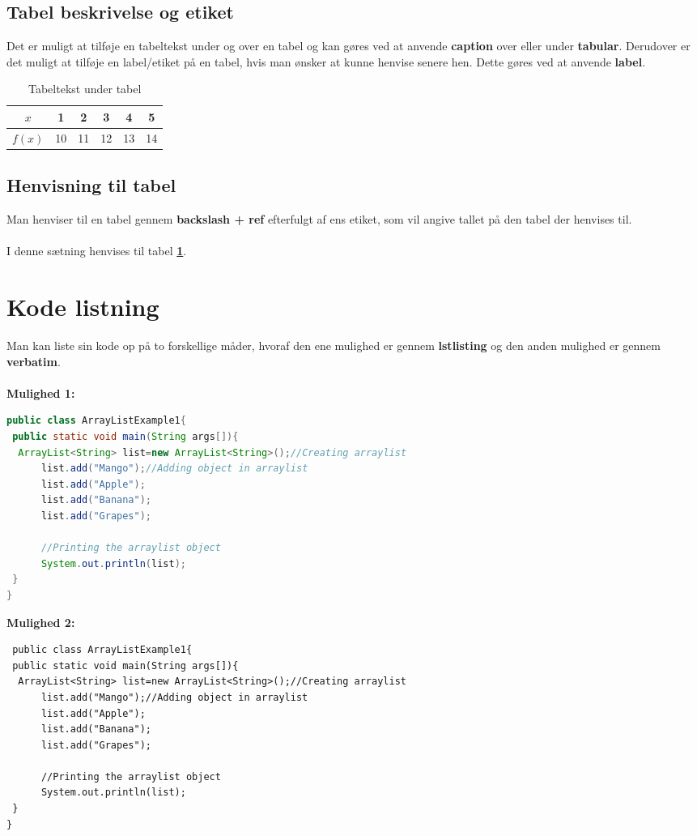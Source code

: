 \documentclass[11pt]{article}
\begin{document}
\subsection{Tabel beskrivelse og etiket}
Det er muligt at tilføje en tabeltekst under og over en tabel og kan gøres ved at anvende \textbf{caption} over eller under \textbf{tabular}. Derudover er det muligt at tilføje en label/etiket på en tabel, hvis man ønsker at kunne henvise senere hen. Dette gøres ved at anvende \textbf{label}.
\begin{table}[H]
\centering
\def\arraystretch{1.5} 
\begin{tabular}{|c||c|c|c|c|c|} %
\hline
$x$&1&2&3&4&5\\ \hline %
$f(x)$&10&11&12&13&14\\ \hline
\end{tabular}
\caption{Tabeltekst under tabel}
\label{tab:tal}
\end{table}


\subsection{Henvisning til tabel}
Man henviser til en tabel gennem \textbf{backslash + ref} efterfulgt af ens etiket, som vil angive tallet på den tabel der henvises til. \\\\
I denne sætning henvises til tabel \textbf{\ref{tab:tal}}.
\clearpage

\section{Kode listning}
Man kan liste sin kode op på to forskellige måder, hvoraf den ene mulighed er gennem \textbf{lstlisting} og den anden mulighed er gennem \textbf{verbatim}.\\\\
\textbf{Mulighed 1:}
\begin{lstlisting}[language=Java]
 public class ArrayListExample1{  
 public static void main(String args[]){  
  ArrayList<String> list=new ArrayList<String>();//Creating arraylist    
      list.add("Mango");//Adding object in arraylist    
      list.add("Apple");    
      list.add("Banana");    
      list.add("Grapes"); 
      
      //Printing the arraylist object   
      System.out.println(list);  
 }  
}  
\end{lstlisting}
\vspace{1cm}
\textbf{Mulighed 2: }
\begin{verbatim}
 public class ArrayListExample1{  
 public static void main(String args[]){  
  ArrayList<String> list=new ArrayList<String>();//Creating arraylist    
      list.add("Mango");//Adding object in arraylist    
      list.add("Apple");    
      list.add("Banana");    
      list.add("Grapes"); 
      
      //Printing the arraylist object   
      System.out.println(list);  
 }  
}  
\end{verbatim}
\end{document}
